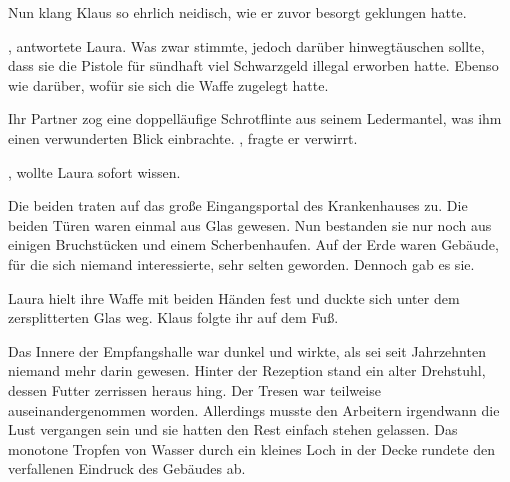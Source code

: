 \par

 Nun klang Klaus so ehrlich neidisch, wie er zuvor besorgt geklungen hatte.

\par

, antwortete Laura.  Was zwar stimmte, jedoch darüber hinwegtäuschen sollte, dass sie die Pistole für sündhaft viel Schwarzgeld illegal erworben hatte. Ebenso wie darüber, wofür sie sich die Waffe zugelegt hatte.

\par

Ihr Partner zog eine doppelläufige Schrotflinte aus seinem Ledermantel, was ihm einen verwunderten Blick einbrachte. , fragte er verwirrt. 

\par

, wollte Laura sofort wissen. 

\par


\par

Die beiden traten auf das große Eingangsportal des Krankenhauses zu. Die beiden Türen waren einmal aus Glas gewesen. Nun bestanden sie nur noch aus einigen Bruchstücken und einem Scherbenhaufen. Auf der Erde waren Gebäude, für die sich niemand interessierte, sehr selten geworden. Dennoch gab es sie.

\par

Laura hielt ihre Waffe mit beiden Händen fest und duckte sich unter dem zersplitterten Glas weg. Klaus folgte ihr auf dem Fuß.

\par

Das Innere der Empfangshalle war dunkel und wirkte, als sei seit Jahrzehnten niemand mehr darin gewesen. Hinter der Rezeption stand ein alter Drehstuhl, dessen Futter zerrissen heraus hing. Der Tresen war teilweise auseinandergenommen worden. Allerdings musste den Arbeitern irgendwann die Lust vergangen sein und sie hatten den Rest einfach stehen gelassen. Das monotone Tropfen von Wasser durch ein kleines Loch in der Decke rundete den verfallenen Eindruck des Gebäudes ab.

